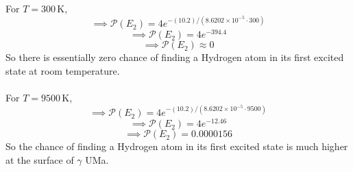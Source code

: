 \documentclass[12pt]{article}
\begin{document}
\begin{flushleft}
For $T=300\,\text{K}$,
$$\implies\mathcal{P}(E_2)=4e^{-(10.2)/(8.6202\times10^{-5}\cdot 300)}$$
$$\implies\mathcal{P}(E_2)=4e^{-394.4}$$
$$\implies\mathcal{P}(E_2)\approx 0$$
So there is essentially zero chance of finding a Hydrogen atom in its first excited state at room temperature.\\~\\

For $T=9500\,\text{K}$,
$$\implies\mathcal{P}(E_2)=4e^{-(10.2)/(8.6202\times10^{-5}\cdot 9500)}$$
$$\implies\mathcal{P}(E_2)=4e^{-12.46}$$
$$\implies\mathcal{P}(E_2)=0.0000156$$
So the chance of finding a Hydrogen atom in its first excited state is much higher at the surface of $\gamma$ UMa.\\~\\


\end{flushleft}
\end{document}
